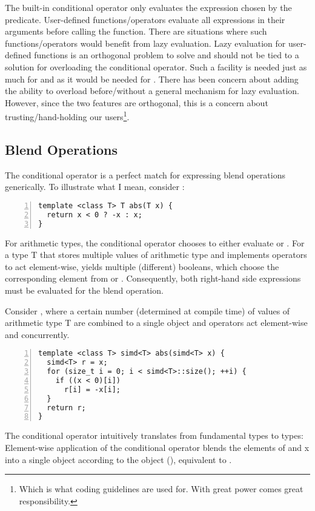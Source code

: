 \begin{description}
    The built-in conditional operator only evaluates the expression chosen by the predicate.
    User-defined functions/operators evaluate all expressions in their arguments before calling the function.
    There are situations where such functions/operators would benefit from lazy evaluation.
    Lazy evaluation for user-defined functions is an orthogonal problem to solve and should not be tied to a solution for overloading the conditional operator.
    Such a facility is needed just as much for  and  as it would be needed for .
    There has been concern about adding the ability to overload  before/without a general mechanism for lazy evaluation.
    However, since the two features are orthogonal, this is a concern about trusting/hand-holding our users\footnote{Which is what coding guidelines are used for. With great power comes great responsibility.}.
\end{description}

\subsection{Blend Operations}\label{sec:blend}
The conditional operator is a perfect match for expressing blend operations generically.
To illustrate what I mean, consider :
\begin{lstlisting}[style=Vc,numbers=left,float,label=lst:genericabs,caption={
Generic absolute value function
}]
template <class T> T abs(T x) {
  return x < 0 ? -x : x;
}
\end{lstlisting}
For arithmetic types, the conditional operator chooses to either evaluate  or .
For a type \type T that stores multiple values of arithmetic type and implements operators to act element-wise,  yields multiple (different) booleans, which choose the corresponding element from  or .
Consequently, both right-hand side expressions must be evaluated for the blend operation.

Consider  \cite[§9]{N4808}, where a certain number (determined at compile time) of values of arithmetic type \type T are combined to a single object and operators act element-wise and concurrently.
\begin{lstlisting}[style=Vc,numbers=left,float,label=lst:elementwiseabs,caption={
Equivalent \code{abs} for element-wise application of the conditional operator
}]
template <class T> simd<T> abs(simd<T> x) {
  simd<T> r = x;
  for (size_t i = 0; i < simd<T>::size(); ++i) {
    if ((x < 0)[i])
      r[i] = -x[i];
  }
  return r;
}
\end{lstlisting}
The conditional operator intuitively translates from fundamental types to  types:
Element-wise application of the conditional operator blends the elements of  and \code x into a single  object according to the  object (), equivalent to .

